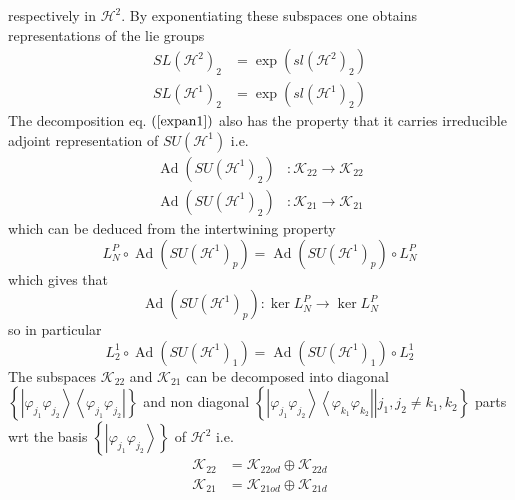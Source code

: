 \documentclass[aps,preprint]{revtex4}%
\begin{document}
respectively in $\mathcal{H}^{2}.$ By exponentiating these subspaces one
obtains representations of the lie groups
\begin{align}
SL\left(  \mathcal{H}^{2}\right)  _{2} &  =\exp\left(  sl\left(
\mathcal{H}^{2}\right)  _{2}\right)  \nonumber\\
SL\left(  \mathcal{H}^{1}\right)  _{2} &  =\exp\left(  sl\left(
\mathcal{H}^{1}\right)  _{2}\right)
\end{align}
The decomposition eq. $\left(  \ref{expan1}\right)  $ also has the property
that it carries irreducible adjoint representation of $SU\left(
\mathcal{H}^{1}\right)  $ i.e.%
\begin{align}
\operatorname{Ad}\left(  SU\left(  \mathcal{H}^{1}\right)  _{2}\right)   &
:\mathcal{K}_{22}\rightarrow\mathcal{K}_{22}\nonumber\\
\operatorname{Ad}\left(  SU\left(  \mathcal{H}^{1}\right)  _{2}\right)   &
:\mathcal{K}_{21}\rightarrow\mathcal{K}_{21}%
\end{align}
which can be deduced from the intertwining property
\begin{equation}
L_{N}^{P}\circ\operatorname{Ad}\left(  SU\left(  \mathcal{H}^{1}\right)
_{p}\right)  =\operatorname{Ad}\left(  SU\left(  \mathcal{H}^{1}\right)
_{p}\right)  \circ L_{N}^{P}%
\end{equation}
which gives that
\begin{equation}
\operatorname{Ad}\left(  SU\left(  \mathcal{H}^{1}\right)  _{p}\right)  :\ker
L_{N}^{P}\rightarrow\ker L_{N}^{P}%
\end{equation}
so in particular
\begin{equation}
L_{2}^{1}\circ\operatorname{Ad}\left(  SU\left(  \mathcal{H}^{1}\right)
_{1}\right)  =\operatorname{Ad}\left(  SU\left(  \mathcal{H}^{1}\right)
_{1}\right)  \circ L_{2}^{1}%
\end{equation}
The subspaces $\mathcal{K}_{22}$ and $\mathcal{K}_{21}$ can be decomposed into
diagonal $\left\{  \left\vert \varphi_{j_{1}}\varphi_{j_{2}}\right\rangle
\left\langle \varphi_{j_{1}}\varphi_{j_{2}}\right\vert \right\}  $ and non
diagonal $\left\{  \left.  \left\vert \varphi_{j_{1}}\varphi_{j_{2}%
}\right\rangle \left\langle \varphi_{k_{1}}\varphi_{k_{2}}\right\vert
\right\vert j_{1},j_{2}\neq k_{1},k_{2}\right\}  $ parts wrt the basis
$\left\{  \left\vert \varphi_{j_{1}}\varphi_{j_{2}}\right\rangle \right\}  $
of $\mathcal{H}^{2}$ i.e.
\begin{align}
\mathcal{K}_{22} &  =\mathcal{K}_{22od}\oplus\mathcal{K}_{22d}\nonumber\\
\mathcal{K}_{21} &  =\mathcal{K}_{21od}\oplus\mathcal{K}_{21d}%
\end{align}
\end{document}
